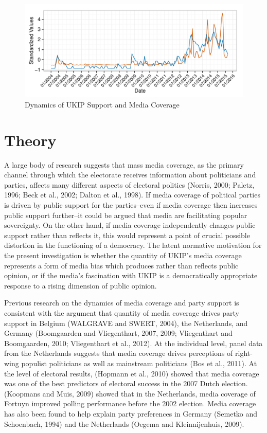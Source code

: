 \documentclass[12pt,article]{article}
\begin{document}
\begin{figure}[htbp]
\centering
\includegraphics{ukip_media_files/figure-latex/unnamed-chunk-2-1.pdf}
\caption{Dynamics of UKIP Support and Media Coverage}
\end{figure}

\section{Theory}\label{theory}

A large body of research suggests that mass media coverage, as the
primary channel through which the electorate receives information about
politicians and parties, affects many different aspects of electoral
politics (Norris, 2000; Paletz, 1996; Beck et al., 2002; Dalton et al.,
1998). If media coverage of political parties is driven by public
support for the parties--even if media coverage then increases public
support further--it could be argued that media are facilitating popular
sovereignty. On the other hand, if media coverage independently changes
public support rather than reflects it, this would represent a point of
crucial possible distortion in the functioning of a democracy. The
latent normative motivation for the present investigation is whether the
quantity of UKIP's media coverage represents a form of media bias which
produces rather than reflects public opinion, or if the media's
fascination with UKIP is a democratically appropriate response to a
rising dimension of public opinion.

Previous research on the dynamics of media coverage and party support is
consistent with the argument that quantity of media coverage drives
party support in Belgium (WALGRAVE and SWERT, 2004), the Netherlands,
and Germany (Boomgaarden and Vliegenthart, 2007, 2009; Vliegenthart and
Boomgaarden, 2010; Vliegenthart et al., 2012). At the individual level,
panel data from the Netherlands suggests that media coverage drives
perceptions of right-wing populist politicians as well as mainstream
politicians (Bos et al., 2011). At the level of electoral results,
(Hopmann et al., 2010) showed that media coverage was one of the best
predictors of electoral success in the 2007 Dutch election. (Koopmans
and Muis, 2009) showed that in the Netherlands, media coverage of
Fortuyn improved polling performance before the 2002 election. Media
coverage has also been found to help explain party preferences in
Germany (Semetko and Schoenbach, 1994) and the Netherlands (Oegema and
Kleinnijenhuis, 2009).
\end{document}
